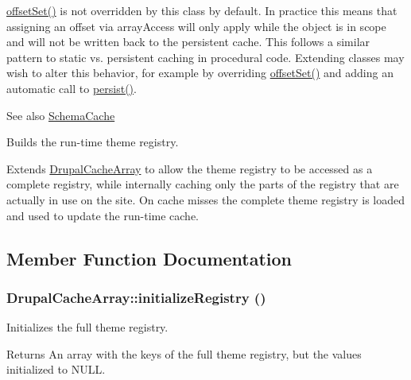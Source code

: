 \hyperlink{group__schemaapi_ga0d3377e6f4b8c592f006a75f8eadf21a}{offsetSet()} is not overridden by this class by default. In practice this means that assigning an offset via arrayAccess will only apply while the object is in scope and will not be written back to the persistent cache. This follows a similar pattern to static vs. persistent caching in procedural code. Extending classes may wish to alter this behavior, for example by overriding \hyperlink{group__schemaapi_ga0d3377e6f4b8c592f006a75f8eadf21a}{offsetSet()} and adding an automatic call to \hyperlink{group__schemaapi_ga27687007f42979bdb8999683f3270c4a}{persist()}.

\begin{DoxySeeAlso}{See also}
\hyperlink{classSchemaCache}{SchemaCache}
\end{DoxySeeAlso}
Builds the run-\/time theme registry.

Extends \hyperlink{classDrupalCacheArray}{DrupalCacheArray} to allow the theme registry to be accessed as a complete registry, while internally caching only the parts of the registry that are actually in use on the site. On cache misses the complete theme registry is loaded and used to update the run-\/time cache. 

\subsection{Member Function Documentation}
\hypertarget{classDrupalCacheArray_a0d87b8b0e005c00bbf7fa6ed11cd1e26}{
\subsubsection[{initializeRegistry}]{\setlength{\rightskip}{0pt plus 5cm}DrupalCacheArray::initializeRegistry ()}}
\label{classDrupalCacheArray_a0d87b8b0e005c00bbf7fa6ed11cd1e26}
Initializes the full theme registry.

\begin{DoxyReturn}{Returns}
An array with the keys of the full theme registry, but the values initialized to NULL. 
\end{DoxyReturn}



